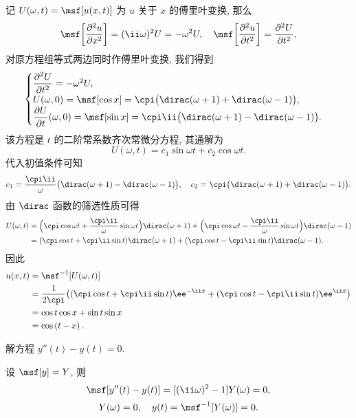 \begin{solution}
  记 $U(\omega,t)=\msf[u(x,t)]$ 为 $u$ 关于 $x$ 的傅里叶变换, 那么
  \[
    \msf\biggl[\frac{\partial^2u}{\partial x^2}\biggr]
   =(\ii\omega)^2 U
   =-\omega^2 U,\quad
    \msf\biggl[\frac{\partial^2u}{\partial t^2}\biggr]
   =\frac{\partial^2 U}{\partial t^2},
  \]
  对原方程组等式两边同时作傅里叶变换, 我们得到
  \[\begin{cases}
     \dfrac{\partial^2 U}{\partial t^2}
    =-\omega^2 U,\\
     U(\omega,0)
    =\msf[\cos x]
    =\cpi\bigl(\dirac(\omega+1)+\dirac(\omega-1)\bigr),\\
     \dfrac{\partial U}{\partial t}(\omega,0)
    =\msf[\sin x]
    =\cpi\ii\bigl(\dirac(\omega+1)-\dirac(\omega-1)\bigr).
  \end{cases}\]
  该方程是 $t$ 的二阶常系数齐次常微分方程, 其通解为
  \[
    U(\omega,t)=c_1\sin\omega t+c_{2}\cos\omega t.
  \]
  代入初值条件可知
  \[
     c_1
    =\frac{\cpi\ii}{\omega}\bigl(\dirac(\omega+1)-\dirac(\omega-1)\bigr),\quad
     c_2
    =\cpi\bigl(\dirac(\omega+1)+\dirac(\omega-1)\bigr).
  \]
  由 $\dirac$ 函数的筛选性质可得
  \begin{align*}
     U(\omega,t)&
    =\Bigl(\cpi\cos\omega t+\frac{\cpi\ii}\omega\sin\omega t\Bigr)\dirac(\omega+1)
    +\Bigl(\cpi\cos\omega t-\frac{\cpi\ii}\omega\sin\omega t\Bigr)\dirac(\omega-1)\\&
    =(\cpi\cos t+\cpi\ii\sin t)\dirac(\omega+1)
    +(\cpi\cos t-\cpi\ii\sin t)\dirac(\omega-1).
  \end{align*}
  因此
  \begin{align*}
     u(x,t)&
    =\msf^{-1}[U(\omega,t)]\\&
    =\frac1{2\cpi}\bigl(
       (\cpi\cos t+\cpi\ii\sin t)\ee^{-\ii x}
      +(\cpi\cos t-\cpi\ii\sin t)\ee^{\ii x}
    \bigr)\\&
    =\cos t\cos x+\sin t\sin x\\&
    =\cos\left(t-x\right).
  \end{align*}
\end{solution}

\begin{example}
  \label{exam:second-ode}
  解方程 $y''(t)-y(t)=0$.
\end{example}

\begin{solution}
  设 $\msf[y]=Y$, 则
  \[
    \msf[y''(t)-y(t)]=[(\ii \omega)^2-1]Y(\omega)=0,
  \]
  \[Y(\omega)=0,\quad y(t)=\msf^{-1}[Y(\omega)]=0.\]
\end{solution}

